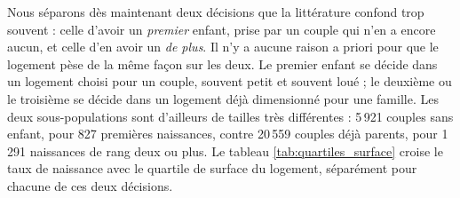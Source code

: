 \documentclass[12pt,a4paper]{article}
\begin{document}
\noindent Nous séparons dès maintenant deux décisions que la littérature confond trop souvent : celle d'avoir un \textit{premier} enfant, prise par un couple qui n'en a encore aucun, et celle d'en avoir un \textit{de plus}. Il n'y a aucune raison a priori pour que le logement pèse de la même façon sur les deux. Le premier enfant se décide dans un logement choisi pour un couple, souvent petit et souvent loué ; le deuxième ou le troisième se décide dans un logement déjà dimensionné pour une famille. Les deux sous-populations sont d'ailleurs de tailles très différentes : 5\,921 couples sans enfant, pour 827 premières naissances, contre 20\,559 couples déjà parents, pour 1\,291 naissances de rang deux ou plus. Le tableau \ref{tab:quartiles_surface} croise le taux de naissance avec le quartile de surface du logement, séparément pour chacune de ces deux décisions. \\

\bigskip
\end{document}
